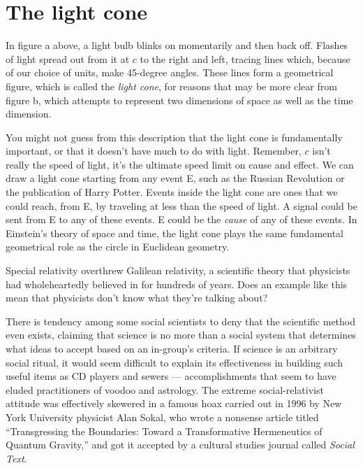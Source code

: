 \pagebreak

\section{The light cone}




In figure a above, a light bulb blinks on momentarily and then back off. Flashes of light spread out from
it at $c$ to the right and left, tracing lines which, because of our choice of units, make 45-degree angles.
These lines form a geometrical figure, which is called the \emph{light cone}, for reasons that may be more
clear from figure b, which attempts to represent two dimensions of space as well as the time dimension.

You might not guess from this description that the light cone is fundamentally important, or that it
doesn't have much to do with light. Remember, $c$ isn't really the speed of light, it's the ultimate
speed limit on cause and effect. We can draw a light cone starting from any event E, such as the
Russian Revolution or the publication of Harry Potter. Events inside the light cone are ones that we could
reach, from E, by traveling at less than the speed of light. A signal could be sent from E to any of these
events. E could be the \emph{cause} of any of these events.
In Einstein's theory of space and time, the light cone plays the same fundamental geometrical role
as the circle in Euclidean geometry.

\pagebreak


Special relativity overthrew Galilean relativity, a scientific theory that
physicists had wholeheartedly believed in for hundreds of years.
Does an example like this mean that physicists don't know what they're talking about?

There is tendency among some social scientists to 
deny that the scientific method even exists, claiming that
science is no more than a social system that
determines what ideas to accept based on an in-group's
criteria. If science is an
arbitrary social ritual, it would seem difficult to explain
its effectiveness in building such useful items as
CD players and sewers --- accomplishments that seem to have eluded practitioners of voodoo and astrology.
The extreme social-relativist attitude was
effectively skewered in a famous hoax
carried out in 1996 by New York University physicist Alan Sokal, who wrote
a nonsense article titled ``Transgressing the Boundaries: Toward a Transformative 
Hermeneutics of Quantum Gravity,'' and got it accepted by a cultural studies
journal called \emph{Social Text}.

